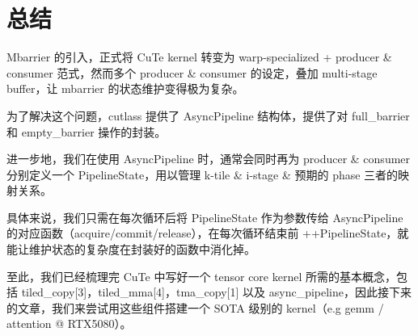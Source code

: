 \section{总结}

Mbarrier 的引入，正式将 CuTe kernel 转变为 warp-specialized + producer \& consumer 范式，然而多个 producer \& consumer 的设定，叠加 multi-stage buffer，让 mbarrier 的状态维护变得极为复杂。

为了解决这个问题，cutlass 提供了 AsyncPipeline 结构体，提供了对 full\_barrier 和 empty\_barrier 操作的封装。

进一步地，我们在使用 AsyncPipeline 时，通常会同时再为 producer \& consumer 分别定义一个 PipelineState，用以管理 k-tile \& i-stage \& 预期的 phase 三者的映射关系。

具体来说，我们只需在每次循环后将 PipelineState 作为参数传给 AsyncPipeline 的对应函数（acquire/commit/release），在每次循环结束前 ++PipelineState，就能让维护状态的复杂度在封装好的函数中消化掉。

至此，我们已经梳理完 CuTe 中写好一个 tensor core kernel 所需的基本概念，包括 tiled\_copy[3]，tiled\_mma[4]，tma\_copy[1] 以及 async\_pipeline，因此接下来的文章，我们来尝试用这些组件搭建一个 SOTA 级别的 kernel（e.g gemm / attention @ RTX5080）。
